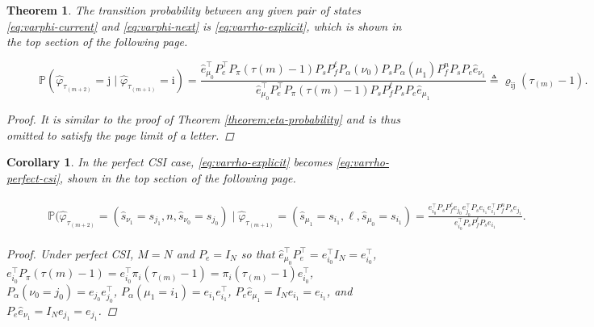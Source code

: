 \documentclass[journal,twoside,web]{ieeecolor}
\newtheorem{theorem}{Theorem}
\newtheorem{corollary}{Corollary}[theorem]
\begin{document}
\begin{theorem}\label{theorem:varphi-probability}
    The transition probability between any given pair of states \eqref{eq:varphi-current} and \eqref{eq:varphi-next} is \eqref{eq:varrho-explicit}, which is shown in the top section of the following page.

\begin{figure}[ht]
\raggedright
\begin{equation}\label{eq:varrho-explicit}
\mathbb{P}(
\hat{\varphi}_{\tau_{(m+2)}}^{} = \mathrm{j} \mid \hat{\varphi}_{\tau_{(m+1)}}^{} = \mathrm{i}) = 
\frac{\hat{e}_{\mu_0}^{\top} P_{e}^{\top} P_{\pi}(\tau{(m)}-1) P_{s} P_{f}^{\ell} P_{\alpha}(\nu_0) P_{s} P_{\alpha}(\mu_1) P_{f}^{n} P_{s} P_{e}\hat{e}_{\nu_1}}{\hat{e}_{\mu_0}^{\top} P_{e}^{\top} P_{\pi}(\tau{(m)}-1) P_{s} P_{f}^{\ell} P_{s} P_{e}\hat{e}_{\mu_1}} 
\triangleq 
\varrho_{\mathrm{i}\mathrm{j}}(\tau_{(m)}-1).
\end{equation}
\end{figure}

\begin{proof}
    It is similar to the proof of Theorem \ref{theorem:eta-probability} and is thus omitted to satisfy the page limit of a letter.
\end{proof}
\end{theorem}
\begin{corollary}\label{corollary:varrho}
In the \emph{perfect CSI} case, \eqref{eq:varrho-explicit} becomes \eqref{eq:varrho-perfect-csi}, shown in the top section of the following page.

\begin{figure}[ht]
\raggedright
\begin{align}\label{eq:varrho-perfect-csi}
    \begin{aligned}
    \mathbb{P}(
    \hat{\varphi}_{\tau_{(m+2)}}^{} = (\hat{s}_{\nu_{1}} = s_{j_1},n,\hat{s}_{\nu_{0}} = s_{j_0}) \mid 
    \hat{\varphi}_{\tau_{(m+1)}}^{} = (\hat{s}_{\mu_{1}} = s_{i_1},\ell,\hat{s}_{\mu_{0}}= s_{i_1}) = \frac{e_{i_0}^{\top} P_{s} P_{f}^{\ell} e_{j_0}e_{j_0}^{\top} P_{s} e_{i_1}e_{i_1}^{\top} P_{f}^{n}P_{s} e_{j_1}}{e_{i_0}^{\top} P_{s}P_{f}^{\ell}P_{s}e_{i_1}}.
    \end{aligned}
\end{align}
\end{figure}
\begin{proof}
    Under perfect CSI, $M=N$ and $P_e = I_{N}$ so that $\hat{e}_{\mu_0}^{\top} P_{e}^{\top} = e_{i_0}^{\top} I_{N} = e_{i_0}^{\top}$, $e_{i_0}^{\top} P_{\pi}(\tau{(m)}-1)=e_{i_0}^{\top}\pi_{i}(\tau_{(m)}-1)=\pi_{i}(\tau_{(m)}-1)e_{i_0}^{\top}$, $P_{\alpha}(\nu_0=j_0)=e_{j_0}e_{j_0}^{\top}$, $P_{\alpha}(\mu_1=i_1)=e_{i_1}e_{i_1}^{\top}$, $P_{e}\hat{e}_{\mu_1} = I_{N} e_{i_1}  = e_{i_1}$, and $P_{e}\hat{e}_{\nu_1} = I_{N} e_{j_1}  = e_{j_1}$.
\end{proof}
\end{corollary}
\end{document}

